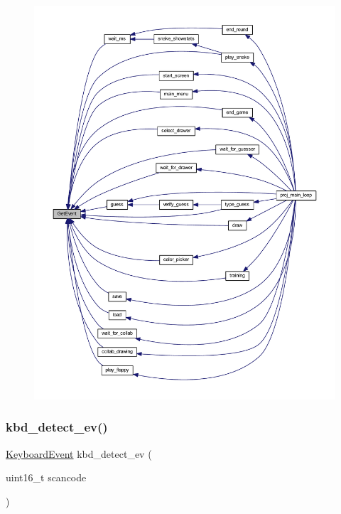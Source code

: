 \begin{figure}[H]
\begin{center}
\leavevmode
\includegraphics[width=350pt]{group__event_ga34dd154f7f761279e2526c29360523a8_icgraph}
\end{center}
\end{figure}
\mbox{\label{group__event_ga971796fc84ffc34d36bcb9d073a94e31}} 
\subsubsection{\texorpdfstring{kbd\+\_\+detect\+\_\+ev()}{kbd\_detect\_ev()}}
{\footnotesize\ttfamily \mbox{\hyperlink{struct_keyboard_event}{Keyboard\+Event}} kbd\+\_\+detect\+\_\+ev (\begin{DoxyParamCaption}\item[{uint16\+\_\+t}]{scancode }\end{DoxyParamCaption})}




